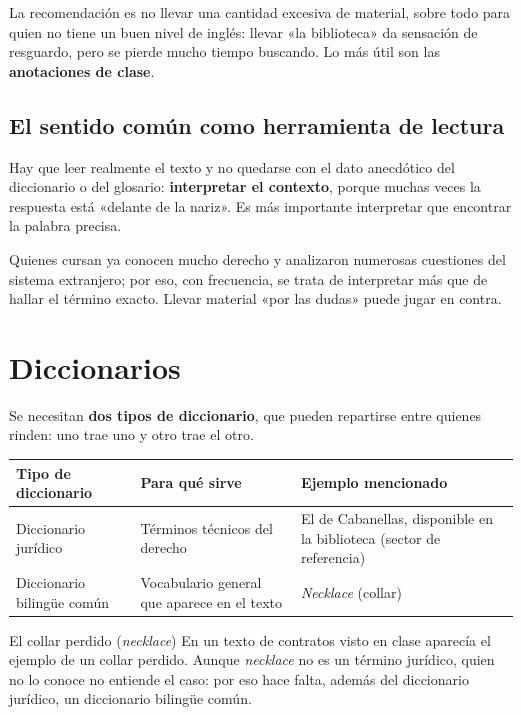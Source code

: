 \documentclass[12pt,oneside]{book}
\begin{document}
La recomendación es no llevar una cantidad excesiva de material, sobre todo para quien no tiene un buen nivel de inglés: llevar «la biblioteca» da sensación de resguardo, pero se pierde mucho tiempo buscando. Lo más útil son las \textbf{anotaciones de clase}.

\subsection{El sentido común como herramienta de lectura}

\begin{important}
Hay que leer realmente el texto y no quedarse con el dato anecdótico del diccionario o del glosario: \textbf{interpretar el contexto}, porque muchas veces la respuesta está «delante de la nariz». Es más importante interpretar que encontrar la palabra precisa.
\end{important}

Quienes cursan ya conocen mucho derecho y analizaron numerosas cuestiones del sistema extranjero; por eso, con frecuencia, se trata de interpretar más que de hallar el término exacto. Llevar material «por las dudas» puede jugar en contra.

\section{Diccionarios}

Se necesitan \textbf{dos tipos de diccionario}, que pueden repartirse entre quienes rinden: uno trae uno y otro trae el otro.

\begin{table}[H]
\centering
\begin{tabularx}{\textwidth}{P{3.8cm}LL}
\toprule
\textbf{Tipo de diccionario} & \textbf{Para qué sirve} & \textbf{Ejemplo mencionado} \\
\midrule
Diccionario jurídico & Términos técnicos del derecho & El de Cabanellas, disponible en la biblioteca (sector de referencia) \\
Diccionario bilingüe común & Vocabulario general que aparece en el texto & \textit{Necklace} (collar) \\
\bottomrule
\end{tabularx}
\end{table}

\begin{example}{El collar perdido (\textit{necklace})}
En un texto de contratos visto en clase aparecía el ejemplo de un collar perdido. Aunque \textit{necklace} no es un término jurídico, quien no lo conoce no entiende el caso: por eso hace falta, además del diccionario jurídico, un diccionario bilingüe común.
\end{example}
\end{document}
